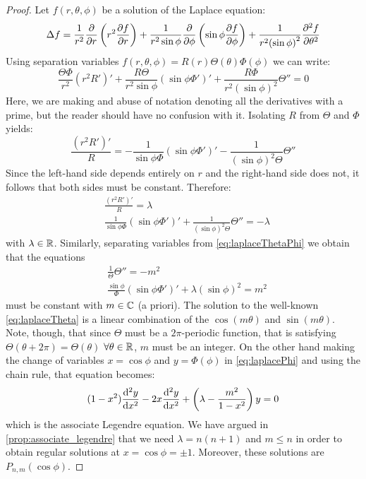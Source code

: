 \documentclass[../main.tex]{subfiles}
\begin{document}
\begin{proof}
  Let $f(r,\theta,\phi)$ be a solution of the Laplace equation:
  \begin{equation}
    \Delta f = \frac{1}{r^2}\pdv{}{r}\left(r^2\pdv{f}{r}\right)+\frac{1}{r^2\sin\phi}\pdv{}{\phi}\left(\sin\phi\pdv{f}{\phi}\right)+\frac{1}{r^2{(\sin\phi)}^2}\pdv[2]{f}{\theta}
  \end{equation}
  Using separation variables $f(r,\theta,\phi)=R(r)\Theta(\theta)\Phi(\phi)$ we can write:
  \begin{equation}
    \frac{\Theta\Phi}{r^2}{(r^2R')}'+\frac{R\Theta}{r^2\sin\phi}{(\sin\phi\Phi')}'+\frac{R\Phi}{r^2{(\sin\phi)}^2}\Theta''=0
  \end{equation}
  Here, we are making and abuse of notation denoting all the derivatives with a prime, but the reader should have no confusion with it. Isolating $R$ from $\Theta$ and $\Phi$ yields:
  \begin{equation}
    \frac{{(r^2R')}'}{R}=-\frac{1}{\sin\phi\Phi}{(\sin\phi\Phi')}'-\frac{1}{{(\sin\phi)}^2\Theta}\Theta''
  \end{equation}
  Since the left-hand side depends entirely on $r$ and the right-hand side does not, it follows that both sides must be constant. Therefore:
  \begin{align}
    \label{eq:laplaceR}        & \frac{{(r^2R')}'}{R}=\lambda                                                               \\
    \label{eq:laplaceThetaPhi} & \frac{1}{\sin\phi\Phi}{(\sin\phi\Phi')}'+\frac{1}{{(\sin\phi)}^2\Theta}\Theta''  =-\lambda
  \end{align}
  with $\lambda\in\mathbb{R}$. Similarly, separating variables from \cref{eq:laplaceThetaPhi} we obtain that the equations
  \begin{align}
    \label{eq:laplaceTheta} & \frac{1}{\Theta}\Theta''  =-m^2                                     \\
    \label{eq:laplacePhi}   & \frac{\sin\phi}{\Phi}{(\sin\phi\Phi')}'+\lambda{(\sin\phi)}^2  =m^2
  \end{align}
  must be constant with $m\in\mathbb{C}$ (a priori). The solution to the well-known \cref{eq:laplaceTheta} is a linear combination of the $\cos(m\theta)$ and $\sin(m\theta)$. Note, though, that since $\Theta$ must be a $2\pi$-periodic function, that is satisfying $\Theta(\theta+2\pi)=\Theta(\theta)$ $\forall\theta\in\mathbb{R}$, $m$ must be an integer. On the other hand making the change of variables $x=\cos \phi$ and $y=\Phi(\phi)$ in \cref{eq:laplacePhi} and using the chain rule, that equation becomes:
  \begin{equation}\label{}
    (1-x^2)\dv[2]{y}{x}-2x\dv[2]{y}{x}+\left(\lambda-\frac{m^2}{1-x^2}\right)y=0
  \end{equation}
  which is the associate Legendre equation. We have argued in \cref{prop:associate_legendre} that we need $\lambda=n(n+1)$ and $m\leq n$ in order to obtain regular solutions at $x=\cos\phi=\pm 1$. Moreover, these solutions are $P_{n,m}(\cos\phi)$.


\end{proof}
\end{document}
